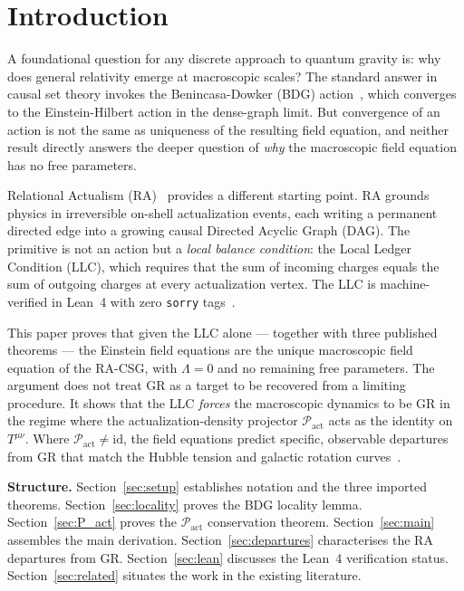 \documentclass[11pt,a4paper]{article}
\newcommand{\Pact}{\mathcal{P}_{\mathrm{act}}}
\begin{document}
\section{Introduction}
\label{sec:intro}

A foundational question for any discrete approach to quantum gravity
is: why does general relativity emerge at macroscopic scales? The
standard answer in causal set theory invokes the Benincasa-Dowker
(BDG) action~\citep{Benincasa2010}, which converges to the
Einstein-Hilbert action in the dense-graph limit. But convergence of
an action is not the same as uniqueness of the resulting field
equation, and neither result directly answers the deeper question of
\emph{why} the macroscopic field equation has no free parameters.

Relational Actualism (RA)~\citep{Sandeman2026RAQM} provides a
different starting point. RA grounds physics in irreversible on-shell
actualization events, each writing a permanent directed edge into a
growing causal Directed Acyclic Graph (DAG). The primitive is not an
action but a \emph{local balance condition}: the Local Ledger
Condition (LLC), which requires that the sum of incoming charges
equals the sum of outgoing charges at every actualization vertex.
The LLC is machine-verified in Lean~4 with zero \texttt{sorry}
tags~\citep{Sandeman2026RAGC}.

This paper proves that given the LLC alone --- together with three
published theorems --- the Einstein field equations are the unique
macroscopic field equation of the RA-CSG, with $\Lambda = 0$ and no
remaining free parameters. The argument does not treat GR as a target
to be recovered from a limiting procedure. It shows that the LLC
\emph{forces} the macroscopic dynamics to be GR in the regime where
the actualization-density projector $\Pact$ acts as the identity on
$T^{\mu\nu}$. Where $\Pact \neq \mathrm{id}$, the field equations
predict specific, observable departures from GR that match the Hubble
tension and galactic rotation curves~\citep{Sandeman2026RAGC,
Sandeman2026RADM}.

\medskip\noindent
\textbf{Structure.}
Section~\ref{sec:setup} establishes notation and the three imported
theorems. Section~\ref{sec:locality} proves the BDG locality lemma.
Section~\ref{sec:P_act} proves the $\Pact$ conservation theorem.
Section~\ref{sec:main} assembles the main derivation.
Section~\ref{sec:departures} characterises the RA departures from GR.
Section~\ref{sec:lean} discusses the Lean~4 verification status.
Section~\ref{sec:related} situates the work in the existing literature.
\end{document}
